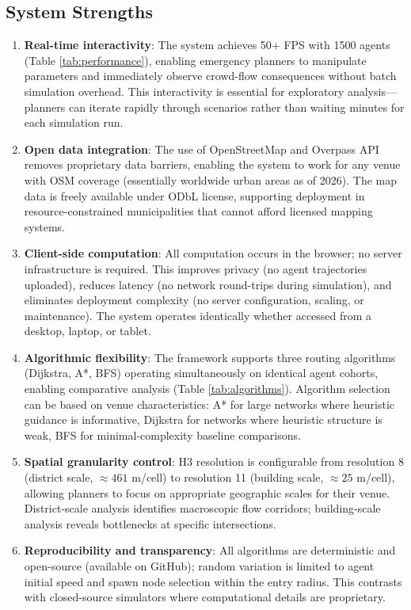 \documentclass[conference]{IEEEtran}
\begin{document}
\subsection{System Strengths}

\begin{enumerate}
\item \textbf{Real-time interactivity}: The system achieves 50+ FPS with 1500 agents (Table \ref{tab:performance}), enabling emergency planners to manipulate parameters and immediately observe crowd-flow consequences without batch simulation overhead. This interactivity is essential for exploratory analysis—planners can iterate rapidly through scenarios rather than waiting minutes for each simulation run.

\item \textbf{Open data integration}: The use of OpenStreetMap and Overpass API removes proprietary data barriers, enabling the system to work for any venue with OSM coverage (essentially worldwide urban areas as of 2026). The map data is freely available under ODbL license, supporting deployment in resource-constrained municipalities that cannot afford licensed mapping systems.

\item \textbf{Client-side computation}: All computation occurs in the browser; no server infrastructure is required. This improves privacy (no agent trajectories uploaded), reduces latency (no network round-trips during simulation), and eliminates deployment complexity (no server configuration, scaling, or maintenance). The system operates identically whether accessed from a desktop, laptop, or tablet.

\item \textbf{Algorithmic flexibility}: The framework supports three routing algorithms (Dijkstra, A*, BFS) operating simultaneously on identical agent cohorts, enabling comparative analysis (Table \ref{tab:algorithms}). Algorithm selection can be based on venue characteristics: A* for large networks where heuristic guidance is informative, Dijkstra for networks where heuristic structure is weak, BFS for minimal-complexity baseline comparisons.

\item \textbf{Spatial granularity control}: H3 resolution is configurable from resolution 8 (district scale, $\approx 461$ m/cell) to resolution 11 (building scale, $\approx 25$ m/cell), allowing planners to focus on appropriate geographic scales for their venue. District-scale analysis identifies macroscopic flow corridors; building-scale analysis reveals bottlenecks at specific intersections.

\item \textbf{Reproducibility and transparency}: All algorithms are deterministic and open-source (available on GitHub); random variation is limited to agent initial speed and spawn node selection within the entry radius. This contrasts with closed-source simulators where computational details are proprietary.
\end{enumerate}
\end{document}

